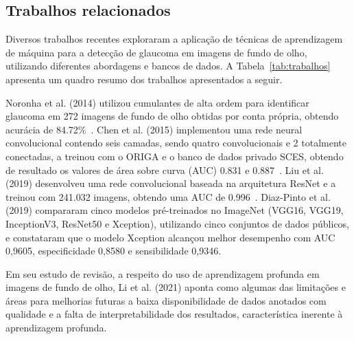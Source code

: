 \documentclass[12pt]{article}
\begin{document}
\subsection{Trabalhos relacionados}
\label{sec:review:related}

Diversos trabalhos recentes exploraram a aplicação de técnicas de aprendizagem de máquina para a detecção de glaucoma em imagens de fundo de olho, utilizando diferentes abordagens e bancos de dados. A Tabela~\ref{tab:trabalhos} apresenta um quadro resumo dos trabalhos apresentados a seguir.

Noronha et al. (2014) utilizou cumulantes de alta ordem para identificar glaucoma em 272 imagens de fundo de olho obtidas por conta própria, obtendo acurácia de 84.72\%~\cite{noronha2014hoc}. Chen et al. (2015) implementou uma rede neural convolucional contendo seis camadas, sendo quatro convolucionais e 2 totalmente conectadas, a treinou com o ORIGA e o banco de dados privado SCES, obtendo de resultado os valores de área sobre curva (AUC) 0.831 e 0.887~\cite{chen2015cnn}. Liu et al. (2019) desenvolveu uma rede convolucional baseada na arquitetura ResNet e a treinou com 241.032 imagens, obtendo uma AUC de 0.996~\cite{liu_cnn_2019}. Diaz-Pinto et al. (2019) compararam cinco modelos pré-treinados no ImageNet (VGG16, VGG19, InceptionV3, ResNet50 e Xception), utilizando cinco conjuntos de dados públicos, e constataram que o modelo Xception alcançou melhor desempenho com AUC 0,9605, especificidade 0,8580 e sensibilidade 0,9346.

Em seu estudo de revisão, a respeito do uso de aprendizagem profunda em imagens de fundo de olho, Li et al. (2021) \cite{li_review_2021} aponta como algumas das limitações e áreas para melhorias futuras a baixa disponibilidade de dados anotados com qualidade e a falta de interpretabilidade dos resultados, característica inerente à aprendizagem profunda.
\end{document}
